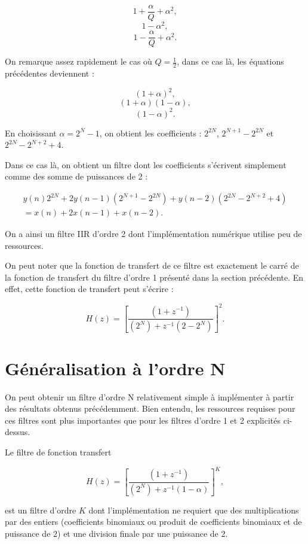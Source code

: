 \documentclass{article}
\begin{document}
\begin{equation}
1+\frac{\alpha}{Q}+\alpha^2,
\end{equation}
\begin{equation}
1-\alpha^2,
\end{equation}
\begin{equation}
1-\frac{\alpha}{Q}+\alpha^2.
\end{equation}

On remarque assez rapidement le cas où $Q=\frac{1}{2}$, dans ce cas là, les équations précédentes deviennent :

\begin{equation}
(1+\alpha)^2,
\end{equation}
\begin{equation}
(1+\alpha)(1-\alpha),
\end{equation}
\begin{equation}
(1-\alpha)^2.
\end{equation}

En choisissant $\alpha=2^N-1$, on obtient les coefficients : $2^{2N}$, $2^{N+1}-2^{2N}$ et $2^{2N}-2^{N+2}+4$.

Dans ce cas là, on obtient un filtre dont les coefficients s'écrivent simplement comme des somme de puissances de 2 : 

\begin{multline}
y(n)2^{2N}+2y(n-1)(2^{N+1}-2^{2N})+y(n-2)(2^{2N}-2^{N+2}+4)
\\=x(n)+2x(n-1)+x(n-2).
\end{multline}

On a ainsi un filtre IIR d'ordre 2 dont l'implémentation numérique utilise peu de ressources.

On peut noter que la fonction de transfert de ce filtre est exactement le carré de la fonction de transfert du filtre d'ordre 1 présenté dans la section précédente. En effet, cette fonction de transfert peut s'écrire :

\begin{equation}
H(z) = \left[ \frac{(1+z^{-1})}{(2^{N})+z^{-1}(2-2^{N})} \right]^2. 
\end{equation}

\section{Généralisation à l'ordre N}

On peut obtenir un filtre d'ordre N relativement simple à implémenter à partir des résultats obtenus précédemment. Bien entendu, les ressources requises pour ces filtres sont plus importantes que pour les filtres d'ordre 1 et 2 explicités ci-dessus.

Le filtre de fonction transfert 

\begin{equation}
H(z) = \left[ \frac{(1+z^{-1})}{(2^{N})+z^{-1}(1-\alpha)} \right]^K, 
\end{equation}

est un filtre d'ordre $K$ dont l'implémentation ne requiert que des multiplications par des entiers (coefficients binomiaux ou produit de coefficients binomiaux et de puissance de $2$) et une division finale par une puissance de $2$.
\end{document}
